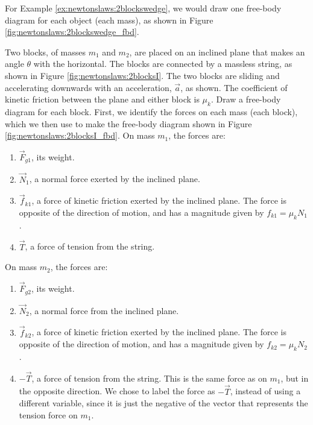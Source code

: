For Example \ref{ex:newtonslaws:2blockswedge}, we would draw one free-body diagram for each object (each mass), as shown in Figure \ref{fig:newtonslaws:2blockswedge_fbd}.

\begin{example}{Two blocks, of masses $m_1$ and $m_2$, are placed on an inclined plane that makes an angle $\theta$ with the horizontal. The blocks are connected by a massless string, as shown in Figure \ref{fig:newtonslaws:2blocksI}. The two blocks are sliding and accelerating downwards with an acceleration, $\vec a$, as shown. The coefficient of kinetic friction between the plane and either block is $\mu_k$. Draw a free-body diagram for each block.}
\label{ex:newtonslaws:2blocksI}
First, we identify the forces on each mass (each block), which we then use to make the free-body diagram shown in Figure \ref{fig:newtonslaws:2blocksI_fbd}. On mass $m_1$, the forces are:

\begin{enumerate}
\item $\vec F_{g1}$, its weight.
\item $\vec N_1$, a normal force exerted by the inclined plane.
\item $\vec f_{k1}$, a force of kinetic friction exerted by the inclined plane. The force is opposite of the direction of motion, and has a magnitude given by $f_{k1}=\mu_kN_1$.
\item $\vec T$, a force of tension from the string. 
\end{enumerate}

On mass $m_2$, the forces are:

\begin{enumerate}
\item $\vec F_{g2}$, its weight.
\item $\vec N_2$, a normal force from the inclined plane.
\item $\vec f_{k2}$, a force of kinetic friction exerted by the inclined plane. The force is opposite of the direction of motion, and has a magnitude given by $f_{k2}=\mu_kN_2$.
\item $-\vec T$, a force of tension from the string. This is the same force as on $m_1$, but in the opposite direction. We chose to label the force as $-\vec T$, instead of using a different variable, since it is just the negative of the vector that represents the tension force on $m_1$. 
\end{enumerate}


\end{example}
